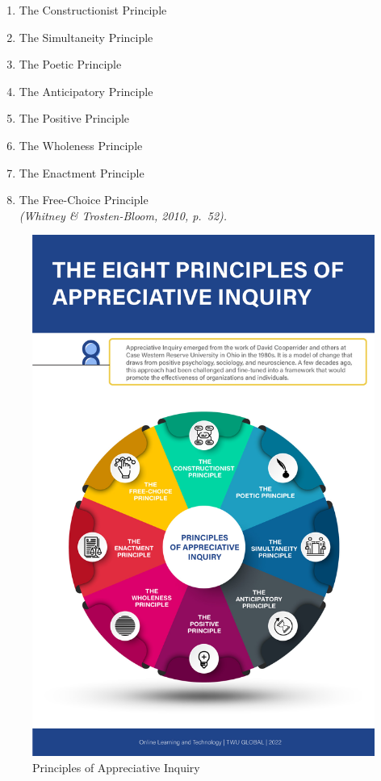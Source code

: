 \documentclass[
]{book}
\providecommand{\tightlist}{%
  \setlength{\itemsep}{0pt}\setlength{\parskip}{0pt}}
\begin{document}
\begin{enumerate}
\def\labelenumi{\arabic{enumi}.}
\tightlist
\item
  The Constructionist Principle\\
\item
  The Simultaneity Principle\\
\item
  The Poetic Principle\\
\item
  The Anticipatory Principle\\
\item
  The Positive Principle\\
\item
  The Wholeness Principle\\
\item
  The Enactment Principle\\
\item
  The Free-Choice Principle\\
  \emph{(Whitney \& Trosten-Bloom, 2010, p.~52).}
\end{enumerate}

\begin{figure}
\centering
\includegraphics{assets/unit5/Principles-of-AI-with-description.jpg}
\caption{Principles of Appreciative Inquiry}
\end{figure}
\end{document}

